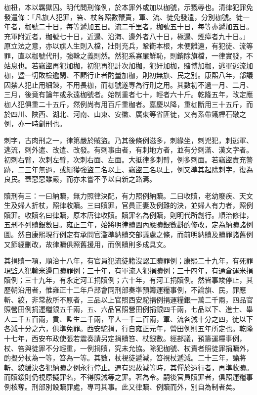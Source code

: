 \begin{pinyinscope}
枷杻，本以羈獄囚。明代問刑條例，於本罪外或加以枷號，示戮辱也。清律犯罪免發遣條：「凡旗人犯罪，笞、杖各照數鞭責，軍、流、徒免發遣，分別枷號。徒一年者，枷號二十日，每等遞加五日。流二千里者，枷號五十日，每等亦遞加五日。充軍附近者，枷號七十日，近邊、沿海、邊外者八十日，極邊、煙瘴者九十日。」原立法之意，亦以旗人生則入檔，壯則充兵，鞏衛本根，未便離遠，有犯徒、流等罪，直以枷號代刑，強榦之義則然。然犯系寡廉鮮恥，則銷除旗檔，一律實發，不姑息也。若竊盜再犯加枷，初犯再犯計次加枷，犯奸加枷，賭博加枷，逃軍逃流加枷，暨一切敗檢逾閑、不顧行止者酌量加枷，則初無旗、民之別。康熙八年，部議囚禁人犯止用細鍊，不用長枷，而枷號遂專為行刑之用。其數初不過一月、二月、三月，後竟有論年或永遠枷號者。始制重者七十，輕者六十斤。乾隆五年，改定應枷人犯俱重二十五斤，然例尚有用百斤重枷者。嘉慶以降，重枷斷用三十五斤，而於四川、陜西、湖北、河南、山東、安徽、廣東等省匪徒，又有系帶鐵桿石礅之例，亦一時創刑也。

刺字，古肉刑之一，律第嚴於賊盜。乃其後條例滋多，刺緣坐，刺兇犯，刺逃軍、逃流，刺外遣、改遣、改發。有刺事由者，有刺地方者，並有分刺滿、漢文字者。初刺右臂，次刺左臂，次刺右面、左面。大抵律多刺臂，例多刺面。若竊盜責充警跡，二三年無過，或緝獲強盜二名以上、竊盜三名以上，例又準其起除刺字，復為良民。蓋惡惡雖嚴，而亦未嘗不予以自新之路焉。

贖刑有三：一曰納贖，無力照律決配，有力照例納贖。二曰收贖，老幼廢疾、天文生及婦人折杖，照律收贖。三曰贖罪，官員正妻及例難的決，並婦人有力者，照例贖罪。收贖名曰律贖，原本唐律收贖。贖罪名為例贖，則明代所創行。順治修律，五刑不列贖銀數目。雍正三年，始將明律贖圖內應贖銀數斟酌修改，定為納贖諸例圖。然自康熙現行例定有承問官濫準納贖交部議處之條，而前明納贖及贖罪諸舊例又節經刪改，故律贖俱照舊援用，而例贖則多成具文。

其捐贖一項，順治十八年，有官員犯流徒籍沒認工贖罪例；康熙二十九年，有死罪現監人犯輸米邊口贖罪例；三十年，有軍流人犯捐贖例；三十四年，有通倉運米捐贖例；三十九年，有永定河工捐贖例；六十年，有河工捐贖例。然皆事竣停止，其歷朝沿用者，惟雍正十二年戶部會同刑部奏準預籌運糧事例，不論旗、民，罪應斬、絞，非常赦所不原者，三品以上官照西安駝捐例捐運糧銀一萬二千兩，四品官照營田例捐運糧銀五千兩，五、六品官照營田例捐銀四千兩，七品以下、進士、舉人二千五百兩，貢、監生二千兩，平人一千二百兩，軍、流各減十分之四，徒以下各減十分之六，俱準免罪。西安駝捐，行自雍正元年，營田例則五年所定也。乾隆十七年，西安布政使張若震奏請另定捐贖笞、杖銀數。經部議，預籌運糧事例，杖、笞與徒罪不分輕重，一例捐贖，究未允協。除犯枷號、杖責者照徒罪捐贖外，酌擬分杖為一等，笞為一等。其數，杖視徒遞減，笞視杖遞減。二十三年，諭將斬、絞緩決各犯納贖之例永行停止。遇有恩赦減等時，其憚於遠行者，再準收贖。而贖鍰則仍視原擬罪名，不得照減等之罪。著為令。嗣後官員贖罪者，俱照運糧事例核奪。刑部別設贖罪處，專司其事。此又律贖、例贖而外，別自為制者矣。


\end{pinyinscope}
